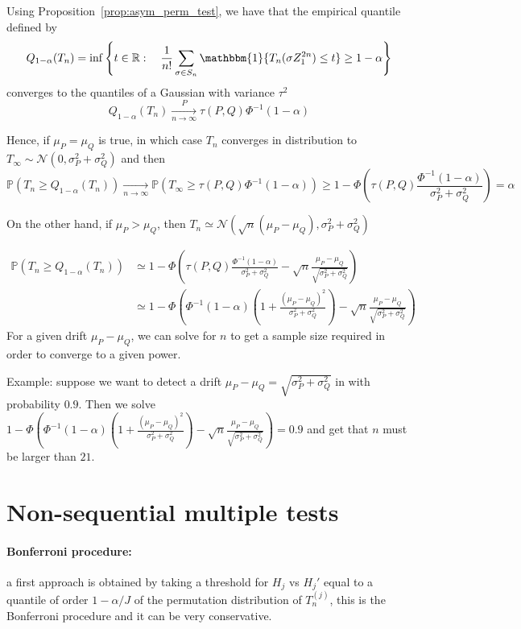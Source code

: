 \documentclass{article}
\theoremstyle{plain}
\theoremstyle{remark}
\renewcommand{\P}{\mathbb{P}}
\newcommand{\R}{\mathbb{R}}
\newcommand{\1}{\mathbbm{1}}
\numberwithin{equation}{section}
\begin{document}
Using Proposition~\ref{prop:asym_perm_test}, we have that the empirical quantile defined by
$$Q_{1-\alpha}(T_n) = \inf\left\{t \in \R:\quad \frac{1}{n!}\sum_{\sigma \in S_n} \1\{T_n(\sigma Z_{1}^{2n}) \le t\} \ge 1-\alpha\right\} $$
converges to the quantiles of a Gaussian with variance $\tau^2$
$$Q_{1-\alpha}(T_n)\xrightarrow[n \to \infty]{P} \tau(P,Q)\Phi^{-1}(1-\alpha) $$

 Hence, if $\mu_P = \mu_Q$ is true, in which case $T_n$ converges in distribution to $T_\infty\sim \mathcal{N}(0,\sigma_P^2+\sigma_Q^2 )$ and then
$$\P\left( T_n \ge Q_{1-\alpha}(T_n)\right) \xrightarrow[n \to \infty]{} \P(T_\infty\ge \tau(P,Q)\Phi^{-1}(1-\alpha)) \ge  1-\Phi\left(\tau(P,Q)\frac{\Phi^{-1}(1-\alpha)}{\sigma_P^2+\sigma_Q^2 } \right)=\alpha  $$

On the other hand, if $\mu_P > \mu_Q$, then $T_n \simeq \mathcal{N}(\sqrt{n}(\mu_P-\mu_Q),\sigma_P^2+\sigma_Q^2 ) $

\begin{align*}
\P\left( T_n \ge Q_{1-\alpha}(T_n)\right)&\simeq  1-\Phi\left(\tau(P,Q)\frac{\Phi^{-1}(1-\alpha)}{\sigma_P^2+\sigma_Q^2 }-  \sqrt{n}\frac{\mu_P-\mu_Q}{\sqrt{\sigma_P^2+\sigma_Q^2}} \right)  \\
&\simeq  1-\Phi\left(\Phi^{-1}(1-\alpha)\left(1+\frac{(\mu_P-\mu_Q)^2}{\sigma_P^2+\sigma_Q^2 }\right)-  \sqrt{n}\frac{\mu_P-\mu_Q}{\sqrt{\sigma_P^2+\sigma_Q^2}} \right)
\end{align*}
For a given drift $\mu_P-\mu_Q$, we can solve for $n$ to get a sample size required in order to converge to a given power.

Example: suppose we want to detect a drift $\mu_P-\mu_Q=\sqrt{\sigma_P^2+\sigma_Q^2}$ in with probability $0.9$. Then we solve $1-\Phi\left(\Phi^{-1}(1-\alpha)\left(1+\frac{(\mu_P-\mu_Q)^2}{\sigma_P^2+\sigma_Q^2 }\right)-  \sqrt{n}\frac{\mu_P-\mu_Q}{\sqrt{\sigma_P^2+\sigma_Q^2}} \right) = 0.9$ and get that $n$ must be larger than $21$.
\section{Non-sequential multiple tests}

\paragraph{Bonferroni procedure:} a first approach is obtained by taking a threshold for $H_j$ vs $H_j'$ equal to a quantile of order $1-\alpha/J$ of the permutation distribution of $T_n^{(j)}$, this is the Bonferroni procedure and it can be very conservative.
\end{document}
